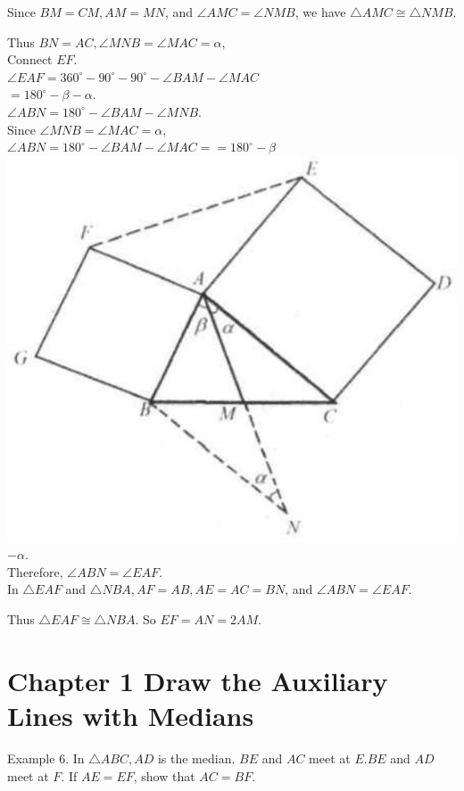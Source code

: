 \documentclass[10pt]{article}
\begin{document}
Since \(B M=C M, A M=M N\), and \(\angle A M C=\angle N M B\), we have \(\triangle A M C \cong \triangle N M B\).

Thus \(B N=A C, \angle M N B=\angle M A C=\alpha\),\\
Connect \(E F\).\\
\(\angle E A F=360^{\circ}-90^{\circ}-90^{\circ}-\angle B A M-\angle M A C\)\\
\(=180^{\circ}-\beta-\alpha\).\\
\(\angle A B N=180^{\circ}-\angle B A M-\angle M N B\).\\
Since \(\angle M N B=\angle M A C=\alpha\),\\
\(\angle A B N=180^{\circ}-\angle B A M-\angle M A C==180^{\circ}-\beta\)\\
\includegraphics[max width=\textwidth, center]{2025_04_17_97bc1f7e44d93c271a88g-025}\\
\(-\alpha\).\\
Therefore, \(\angle A B N=\angle E A F\).\\
In \(\triangle E A F\) and \(\triangle N B A, A F=A B, A E=A C=B N\), and \(\angle A B N=\angle E A F\).

Thus \(\triangle E A F \cong \triangle N B A\). So \(E F=A N=2 A M\).

\section*{Chapter 1 Draw the Auxiliary Lines with Medians}
Example 6. In \(\triangle A B C, A D\) is the median. \(B E\) and \(A C\) meet at \(E . B E\) and \(A D\) meet at \(F\). If \(A E=E F\), show that \(A C=B F\).
\end{document}
